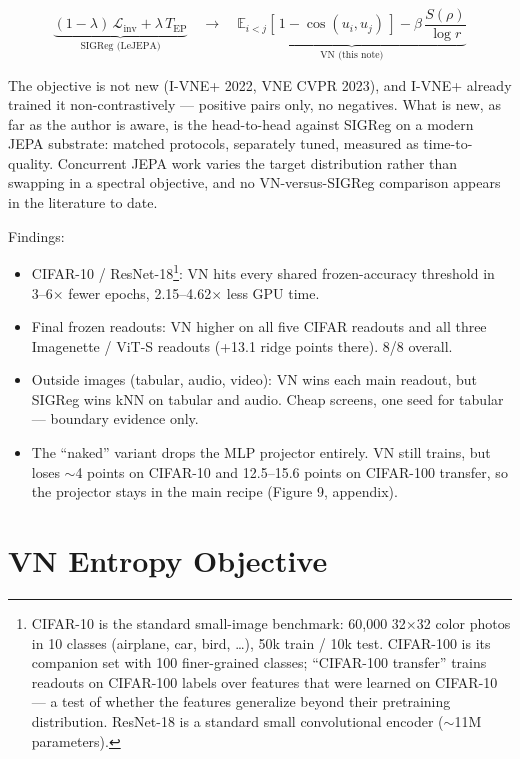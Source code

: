 \documentclass[11pt]{article}
\begin{document}
\begin{equation*}
\underbrace{(1 - \lambda)\, \mathcal{L}_{\mathrm{inv}} + \lambda \, T_{\mathrm{EP}}}_{\text{SIGReg (LeJEPA)}} \quad\longrightarrow\quad \underbrace{\mathbb{E}_{i<j}\!\left[\, 1 - \cos(u_i, u_j) \,\right] - \beta \, \frac{S(\rho)}{\log r}}_{\text{VN (this note)}}
\end{equation*}

The objective is not new (I-VNE+ 2022\cite{ref2}, VNE CVPR 2023\cite{ref3}), and I-VNE+ already trained it non-contrastively --- positive pairs only, no negatives. What is new, as far as the author is aware, is the head-to-head against SIGReg on a modern JEPA substrate: matched protocols, separately tuned, measured as time-to-quality. Concurrent JEPA work varies the target distribution\cite{ref16} rather than swapping in a spectral objective, and no VN-versus-SIGReg comparison appears in the literature to date.

Findings:

\begin{itemize}
\item CIFAR-10 / ResNet-18\footnote{CIFAR-10\cite{ref17} is the standard small-image benchmark: 60,000 32\(\times\)32 color photos in 10 classes (airplane, car, bird, \dots{}), 50k train / 10k test. CIFAR-100 is its companion set with 100 finer-grained classes; ``CIFAR-100 transfer'' trains readouts on CIFAR-100 labels over features that were learned on CIFAR-10 --- a test of whether the features generalize beyond their pretraining distribution. ResNet-18\cite{ref18} is a standard small convolutional encoder (\(\sim\)11M parameters).}: VN hits every shared frozen-accuracy threshold in 3--6\(\times\) fewer epochs, 2.15--4.62\(\times\) less GPU time.
\item Final frozen readouts: VN higher on all five CIFAR readouts and all three Imagenette / ViT-S readouts (+13.1 ridge points there). 8/8 overall.
\item Outside images (tabular, audio, video): VN wins each main readout, but SIGReg wins kNN on tabular and audio. Cheap screens, one seed for tabular --- boundary evidence only.
\item The ``naked'' variant drops the MLP projector entirely. VN still trains, but loses \(\sim\)4 points on CIFAR-10 and 12.5--15.6 points on CIFAR-100 transfer, so the projector stays in the main recipe (Figure 9, appendix).
\end{itemize}

\section{VN Entropy Objective}
\label{sec:objective}
\end{document}
